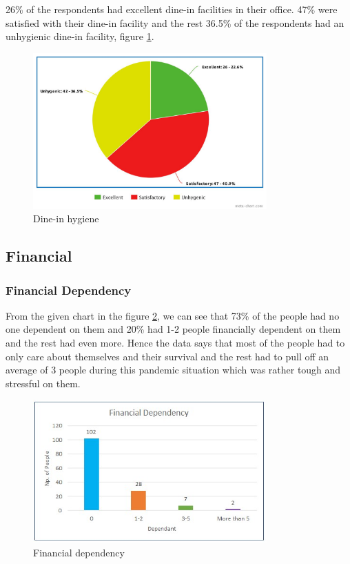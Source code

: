 \documentclass[11pt]{article}
\begin{document}
26\% of the respondents had excellent dine-in facilities in their office. 47\% were satisfied with their dine-in facility and the rest 36.5\% of the respondents had an unhygienic dine-in facility, figure \ref{hygiene}. 

\begin{figure}[!ht]
	\centering
	\includegraphics[width=0.8\textwidth]{Images/Experience/hygiene.jpeg}
	\caption{Dine-in hygiene}
	\centering
	\label{hygiene}
\end{figure}

\subsection {Financial}
\subsubsection{Financial Dependency}
From the given chart in the figure \ref{financialDep}, we can see that 73\% of the people had no one dependent on them and 20\% had 1-2 people financially dependent on them and the rest had even more. Hence the data says that most of the people had to only care about themselves and their survival and the rest had to pull off an average of 3 people during this pandemic situation which was rather tough and stressful on them.
\newpage
\begin{figure}[!ht]
	\centering
	\includegraphics[width=0.8\textwidth]{Images/Finance/Financial Dependency.jpg}
	\caption{Financial dependency}
	\centering
	\label{financialDep}
\end{figure}
\end{document}

